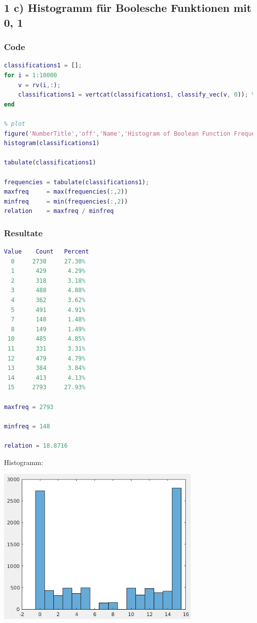 \documentclass[12pt]{article}
\begin{document}
\subsection{1 c) Histogramm f\"ur Boolesche Funktionen mit 0, 1}
\subsubsection{Code}
\begin{lstlisting}[language=Matlab]
classifications1 = [];
for i = 1:10000
    v = rv(i,:);
    classifications1 = vertcat(classifications1, classify_vec(v, 0)); % classify v using 0, 1 as boolean values
end

% plot
figure('NumberTitle','off','Name','Histogram of Boolean Function Frequencies');
histogram(classifications1)

tabulate(classifications1)

frequencies = tabulate(classifications1);
maxfreq     = max(frequencies(:,2))
minfreq     = min(frequencies(:,2))
relation    = maxfreq / minfreq
\end{lstlisting}
\subsubsection{Resultate}
\begin{lstlisting}[language=Matlab]
Value    Count   Percent
  0     2730     27.30%
  1      429      4.29%
  2      318      3.18%
  3      488      4.88%
  4      362      3.62%
  5      491      4.91%
  7      148      1.48%
  8      149      1.49%
 10      485      4.85%
 11      331      3.31%
 12      479      4.79%
 13      384      3.84%
 14      413      4.13%
 15     2793     27.93%

maxfreq = 2793

minfreq = 148

relation = 18.8716
\end{lstlisting}
Histogramm:\\
\begin{center}
\includegraphics[width=10cm]{rel_freq_hist01.png}
\end{center}
\end{document}
